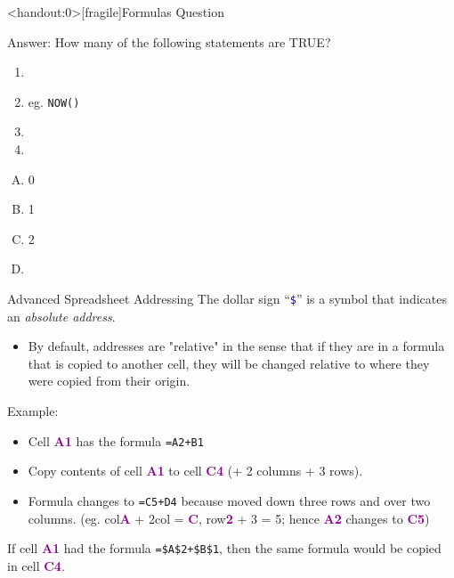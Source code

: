 \documentclass[xcolor=svgnames]{beamer}
\newcommand{\blue}[1]{{\textcolor{blue}{#1}}}
\newcommand{\cell}[1]{{\sf \textbf{\textcolor{DarkMagenta}{#1}}}}
\begin{document}
\begin{frame}<handout:0>[fragile]{Formulas Question}
\begin{block}
{Answer:} How many of the following statements are TRUE?
\begin{enumerate}
\item {}
\item { eg. {\tt NOW()}}
\item {}
\item {}
\end{enumerate}
\begin{enumerate}[A)]
\item  0		
\item 1		
\item 2		
\item \textbf<4>{\textit<4>{{}}}
\end{enumerate}
\end{block}
\end{frame}


\begin{frame}[fragile]{Advanced Spreadsheet Addressing}
The dollar sign ``\blue{\tt\$}'' is a symbol that indicates an \emph{absolute address}.  
\begin{itemize}
\item By default, addresses are "relative" in the sense that if they are in a formula that is copied to another cell, they will be changed relative to where they were copied from their origin.
\end{itemize}
Example:
\begin{itemize}
\item Cell \cell{A1} has the formula {\tt =A2+B1}
\item Copy contents of cell \cell{A1} to cell \cell{C4} (+ 2 columns + 3 rows).  
\item Formula changes to {\tt =C5+D4} because moved down three rows and over two columns. (eg. col\cell{A} + 2col = \cell{C}, row\cell{2} + 3 = 5; hence \cell{A2} changes to \cell{C5})
\end{itemize}
If cell \cell{A1} had the formula \verb|=$A$2+$B$1|, then the same formula would be copied in cell \cell{C4}.
\end{frame}
\end{document}
